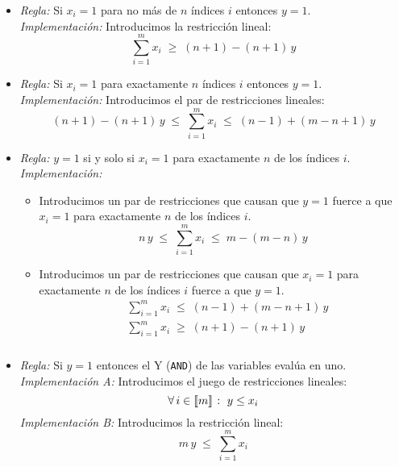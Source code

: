 \documentclass[ 10pt, xcolor = dvipsnames]{beamer}
\begin{document}
\begin{frame}[allowframebreaks]
\begin{itemize}
\item \emph{Regla:} Si $x_i = 1$ para no m\'as de $n$ \'indices $i$ entonces $y=1$. \\[1ex] \emph{Implementaci\'on:} Introducimos la restricci\'on lineal: 
\[
\sum_{i=1}^m x_i \; \geq \; (n + 1) - (n + 1) \, y
\]
\item \emph{Regla:} Si $x_i = 1$ para exactamente $n$ \'indices $i$ entonces $y=1$. \\[1ex] \emph{Implementaci\'on:} Introducimos el par de restricciones lineales: 
\[
(n + 1) - (n + 1) \, y \; \leq \;
\sum_{i=1}^m x_i \; \leq \; (n-1) + (m-n+1) \, y
\]
\framebreak

\item \emph{Regla:} $y = 1$ si y solo si $x_i = 1$ para exactamente $n$ de los \'indices $i$. \\[1ex] \emph{Implementaci\'on:}
\begin{itemize}
\item Introducimos un par de restricciones que causan que $y = 1$ fuerce a que $x_i = 1$ para exactamente $n$ de los \'indices $i$. 
\[
n \, y \; \leq \; \sum_{i=1}^m x_i \; \leq \; m - (m-n) \, y
\]
\item Introducimos un par de restricciones que causan que $x_i = 1$ para exactamente $n$ de los \'indices $i$ fuerce a que $y = 1$. 
\begin{align*}
& \sum_{i=1}^m x_i \; \leq \; (n - 1) + (m - n + 1) \, y \\
& \sum_{i=1}^m x_i \; \geq \; (n + 1) - (n + 1) \, y
\end{align*}
\end{itemize}

\end{itemize}

\end{frame}

\begin{frame}[allowframebreaks]
\frametitle{\insertsection}

\begin{itemize}
\item \emph{Regla:} Si $y = 1$ entonces el Y (\texttt{AND}) de las variables eval\'ua en uno. \\[1ex] \emph{Implementaci\'on A:} Introducimos el juego de restricciones lineales: 
\[
\forall \, i \in \llbracket m \rrbracket \; \colon \; y \leq x_i
\]
\emph{Implementaci\'on B:} Introducimos la restricci\'on lineal: 
\[
m \, y \; \leq \; \sum_{i=1}^m x_i
\]

\end{itemize}

\end{frame}
\end{document}
